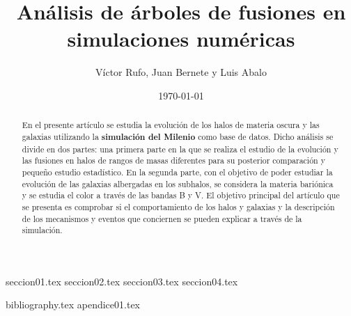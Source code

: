 \documentclass[a4paper, amsfonts, amssymb, amsmath, reprint, showkeys, nofootinbib, twoside]{revtex4-1}
\begin{document}
\renewcommand{\tablename}{\textit{Tabla}}
\renewcommand{\figurename}{\textit{Figura}}

\title{Análisis de árboles de fusiones en simulaciones numéricas}

\author{Víctor Rufo, Juan Bernete y Luis Abalo}

\date{\today} %

\begin{abstract}
En el presente artículo se estudia la evolución de los halos de materia oscura y las galaxias utilizando la \textbf{simulación del Milenio} como base de datos. Dicho análisis se divide en dos partes: una primera parte en la que se realiza el estudio de la evolución y las fusiones en halos de rangos de masas diferentes para su posterior comparación y pequeño estudio estadístico. En la segunda parte, con el objetivo de poder estudiar la evolución de las galaxias albergadas en los subhalos, se considera la materia bariónica y se estudia el color a través de las bandas B y V. El objetivo principal del artículo que se presenta es comprobar si el comportamiento de los halos y galaxias y la descripción de los mecanismos y eventos que conciernen se pueden explicar a través de la simulación.

\end{abstract}


\maketitle


{seccion01.tex} 
{seccion02.tex}
{seccion03.tex}
{seccion04.tex}

{bibliography.tex}
\newpage
{apendice01.tex}
\end{document}
